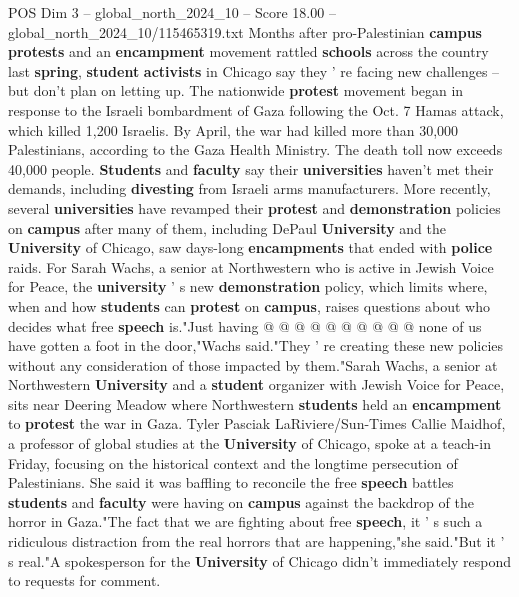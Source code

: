 \begin{textsample}{POS Dim 3 – global\_north\_2024\_10 – Score 18.00 – global\_north\_2024\_10/115465319.txt}  \label{ex:f3_pos_151}
Months after pro-Palestinian \textbf{campus} \textbf{protests} and an \textbf{encampment} movement rattled \textbf{schools} across the country last \textbf{spring}, \textbf{student} \textbf{activists} in Chicago say they ' re facing new challenges -- but don't plan on letting up.
The nationwide \textbf{protest} movement began in response to the Israeli bombardment of Gaza following the Oct. 7 Hamas attack, which killed 1,200 Israelis.
By April, the war had killed more than 30,000 Palestinians, according to the Gaza Health Ministry.
The death toll now exceeds 40,000 people. \textbf{Students} and \textbf{faculty} say their \textbf{universities} haven't met their demands, including \textbf{divesting} from Israeli arms manufacturers.
More recently, several \textbf{universities} have revamped their \textbf{protest} and \textbf{demonstration} policies on \textbf{campus} after many of them, including DePaul \textbf{University} and the \textbf{University} of Chicago, saw days-long \textbf{encampments} that ended with \textbf{police} raids.
For Sarah Wachs, a senior at Northwestern who is active in Jewish Voice for Peace, the \textbf{university} ' s new \textbf{demonstration} policy, which limits where, when and how \textbf{students} can \textbf{protest} on \textbf{campus}, raises questions about who decides what free \textbf{speech} is."Just having @ @ @ @ @ @ @ @ @ @ none of us have gotten a foot in the door,"Wachs said."They ' re creating these new policies without any consideration of those impacted by them."Sarah Wachs, a senior at Northwestern \textbf{University} and a \textbf{student} organizer with Jewish Voice for Peace, sits near Deering Meadow where Northwestern \textbf{students} held an \textbf{encampment} to \textbf{protest} the war in Gaza.
Tyler Pasciak LaRiviere/Sun-Times Callie Maidhof, a professor of global studies at the \textbf{University} of Chicago, spoke at a teach-in Friday, focusing on the historical context and the longtime persecution of Palestinians.
She said it was baffling to reconcile the free \textbf{speech} battles \textbf{students} and \textbf{faculty} were having on \textbf{campus} against the backdrop of the horror in Gaza."The fact that we are fighting about free \textbf{speech}, it ' s such a ridiculous distraction from the real horrors that are happening,"she said."But it ' s real."A spokesperson for the \textbf{University} of Chicago didn't immediately respond to requests for comment.

\end{textsample}
